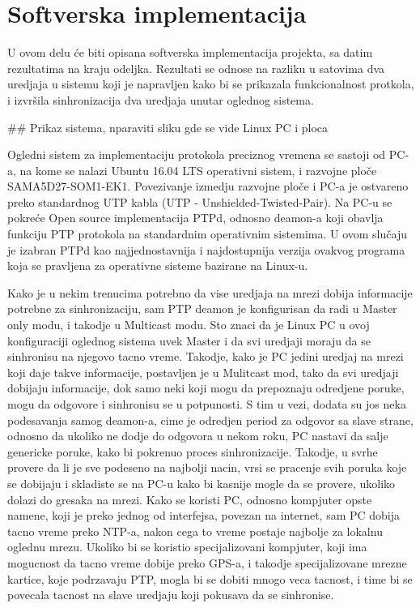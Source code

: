 \documentclass[a4paper,12pt, master]{etf}
\begin{document}
	\newpage

	\chapter{Softverska implementacija}

        U ovom delu \'{c}e biti opisana softverska implementacija projekta, sa datim rezultatima na kraju
        odeljka. Rezultati se odnose na razliku u satovima dva uredjaja u sistemu koji je napravljen kako bi se
        prikazala funkcionalnost protkola, i izvr\v{s}ila sinhronizacija dva uredjaja unutar oglednog sistema.

        \#\# Prikaz sistema, nparaviti sliku gde se vide Linux PC i ploca

        Ogledni sistem za implementaciju protokola preciznog vremena se sastoji od PC-a, na kome se nalazi Ubuntu
        16.04 LTS operativni sistem, i razvojne plo\v{c}e SAMA5D27-SOM1-EK1. Povezivanje izmedju razvojne
        plo\v{c}e i PC-a je ostvareno preko standardnog UTP kabla (UTP - Unshielded-Twisted-Pair). Na PC-u se
        pokre\'{c}e Open source implementacija PTPd, odnosno deamon-a koji obavlja funkciju PTP protokola na
        standardnim operativnim sistemima. U ovom slu\v{c}aju je izabran PTPd kao najjednostavnija i
        najdostupnija verzija ovakvog programa koja se pravljena za operativne sisteme bazirane na Linux-u.

        Kako je u nekim trenucima potrebno da vise uredjaja na mrezi dobija informacije potrebne za
        sinhronizaciju, sam PTP deamon je konfigurisan da radi u Master only modu, i takodje u Multicast modu.
        Sto znaci da je Linux PC u ovoj konfiguraciji oglednog sistema uvek Master i da svi uredjaji moraju da se
        sinhronisu na njegovo tacno vreme. Takodje, kako je PC jedini uredjaj na mrezi koji daje takve
        informacije, postavljen je u Mulitcast mod, tako da svi uredjaji dobijaju informacije, dok samo neki koji
        mogu da prepoznaju odredjene poruke, mogu da odgovore i sinhronisu se u potpunosti. S tim u vezi, dodata
        su jos neka podesavanja samog deamon-a, cime je odredjen period za odgovor sa slave strane, odnosno da
        ukoliko ne dodje do odgovora u nekom roku, PC nastavi da salje genericke poruke, kako bi pokrenuo proces
        sinhronizacije. Takodje, u svrhe provere da li je sve podeseno na najbolji nacin, vrsi se pracenje svih
        poruka koje se dobijaju i skladiste se na PC-u kako bi kasnije mogle da se provere, ukoliko dolazi do
        gresaka na mrezi. Kako se koristi PC, odnosno kompjuter opste namene, koji je preko jednog od interfejsa,
        povezan na internet, sam PC dobija tacno vreme preko NTP-a, nakon cega to vreme postaje najbolje za
        lokalnu oglednu mrezu. Ukoliko bi se koristio specijalizovani kompjuter, koji ima mogucnost da tacno
        vreme dobije preko GPS-a, i takodje specijalizovane mrezne kartice, koje podrzavaju PTP, mogla bi se
        dobiti mnogo veca tacnost, i time bi se povecala tacnost na slave uredjaju koji pokusava da se sinhronise.
\end{document}
